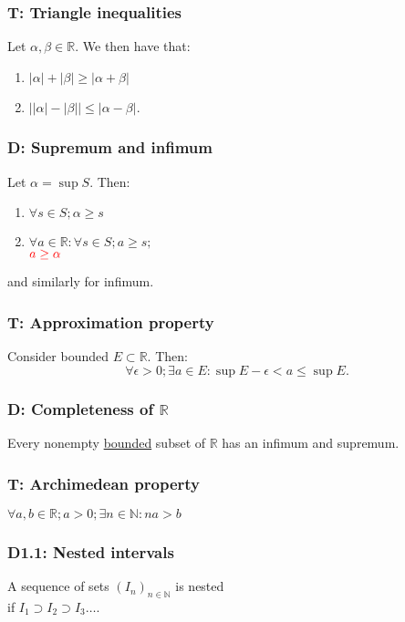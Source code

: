 \documentclass{article}
\begin{document}
\begin{multicols*}{3}
\noindent

\subsubsection*{T: Triangle inequalities}
Let $\alpha,\beta\in\mathbb{R}$.
We then have that:
\begin{enumerate}
    \item $|\alpha|+|\beta|
    \geq|\alpha+\beta|$

    \item $\bigl||\alpha|-|\beta|\bigr|
    \leq|\alpha-\beta|$.
\end{enumerate}

\subsubsection*{D: Supremum and infimum}
Let $\alpha=\sup S$. Then:
\begin{enumerate}
    \item $\forall s\in S; \alpha\geq s$
    \item $\forall a\in\mathbb{R}:
    \forall s\in S; a\geq s;$ \\
    $\textcolor{red}{a\geq\alpha}$
\end{enumerate}
and similarly for infimum.

\subsubsection*{T: Approximation property}
Consider bounded $E\subset\mathbb{R}$. Then:
$$\forall\epsilon>0;\exists a\in E:
\sup E-\epsilon<a\leq\sup E.$$

\subsubsection*{D: Completeness of $\mathbb{R}$}
Every nonempty \underline{bounded} subset
of $\mathbb{R}$ has an infimum and supremum.

\subsubsection*{T: Archimedean property}
$\forall a,b\in\mathbb{R}; a>0;\exists n\in\mathbb{N}
: na>b$

\subsubsection*{D1.1: Nested intervals}
A sequence of sets $(I_n)_{n\in\mathbb{N}}$
is nested \\ if $I_1\supset I_2\supset I_3\dots$.


\end{multicols*}
\end{document}
